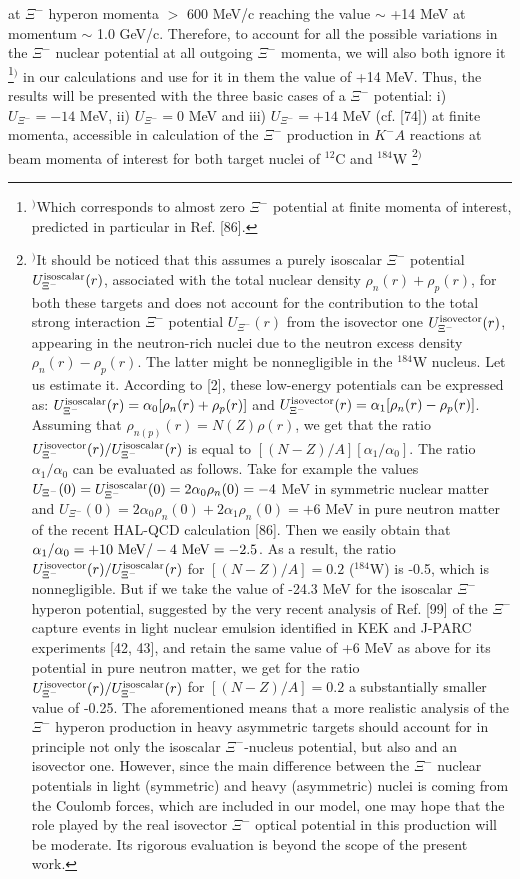 \documentclass[12pt]{article}
\begin{document}
at $\Xi^-$ hyperon momenta $>$ 600 MeV/c reaching the value $\sim$ +14 MeV at momentum $\sim$ 1.0 GeV/c.
Therefore, to account for all the possible variations in the $\Xi^-$ nuclear potential at all outgoing $\Xi^-$
momenta, we will also both ignore it
\footnote{$^)$Which corresponds to almost zero $\Xi^-$ potential at finite momenta of interest, predicted in
particular in Ref. [86].}$^)$
in our
calculations and use for it in them the value of +14 MeV. Thus, the results will be presented with the three basic
cases of a $\Xi^-$ potential: i) $U_{\Xi^-}=-14$ MeV, ii) $U_{\Xi^-}=0$ MeV and iii) $U_{\Xi^-}=+14$ MeV (cf. [74])
at finite momenta, accessible in calculation of the $\Xi^-$ production in $K^-A$ reactions at beam momenta of
interest for both target nuclei of $^{12}$C and $^{184}$W
\footnote{$^)$It should be noticed that this assumes a purely isoscalar $\Xi^-$ potential
$U_{\Xi^-}^{\rm isoscalar}(r)$, associated with the total nuclear density $\rho_n(r)+\rho_p(r)$, for both
these targets and does not account for the contribution to the total strong interaction $\Xi^-$ potential
$U_{\Xi^-}(r)$ from the isovector one $U_{\Xi^-}^{\rm isovector}(r)$, appearing in the neutron-rich nuclei
due to the neutron excess density $\rho_n(r)-\rho_p(r)$. The latter might be nonnegligible in the $^{184}$W
nucleus. Let us estimate it. According to [2], these low-energy potentials can be expressed as:
$U_{\Xi^-}^{\rm isoscalar}(r)=\alpha_0[\rho_n(r)+\rho_p(r)]$ and
$U_{\Xi^-}^{\rm isovector}(r)=\alpha_1[\rho_n(r)-\rho_p(r)]$. Assuming that $\rho_{n(p)}(r)=N(Z)\rho(r)$, we
get that the ratio $U_{\Xi^-}^{\rm isovector}(r)/U_{\Xi^-}^{\rm isoscalar}(r)$ is equal to
$[(N-Z)/A][\alpha_1/\alpha_0]$. The ratio $\alpha_1/\alpha_0$ can be evaluated as follows. Take for example
the values $U_{\Xi^-}(0)=U_{\Xi^-}^{\rm isoscalar}(0)=2\alpha_0\rho_n(0)=-4$ MeV in symmetric nuclear matter
and $U_{\Xi^-}(0)=2\alpha_0\rho_n(0)+2\alpha_1\rho_n(0)=+6$ MeV in pure neutron matter of the recent HAL-QCD
calculation [86]. Then we easily obtain that $\alpha_1/\alpha_0=+10~{\rm MeV}/-4~{\rm MeV}=-2.5$. As a result,
the ratio $U_{\Xi^-}^{\rm isovector}(r)/U_{\Xi^-}^{\rm isoscalar}(r)$ for $[(N-Z)/A]=0.2$ ($^{184}$W) is -0.5,
which is nonnegligible. But if we take the value of -24.3 MeV for the isoscalar $\Xi^-$ hyperon potential,
suggested by the very recent analysis of Ref. [99] of the $\Xi^-$ capture events in light nuclear 
emulsion identified in KEK and J-PARC experiments [42, 43], 
and retain the same value of +6 MeV as above for its potential in pure neutron
matter, we get for the ratio $U_{\Xi^-}^{\rm isovector}(r)/U_{\Xi^-}^{\rm isoscalar}(r)$ for $[(N-Z)/A]=0.2$
a substantially smaller value of -0.25.
The aforementioned means that a more realistic analysis of the $\Xi^-$ hyperon production in heavy
asymmetric targets should account for in principle not only the isoscalar $\Xi^-$-nucleus potential, but also
and an isovector one. However, since the main difference between the $\Xi^-$ nuclear potentials in light (symmetric)
and heavy (asymmetric) nuclei is coming from the Coulomb forces, which are included in our model, one may hope
that the role played by the real isovector $\Xi^-$ optical potential in this production will be moderate.
Its rigorous evaluation is beyond the scope of the present work.}$^)$
\end{document}
